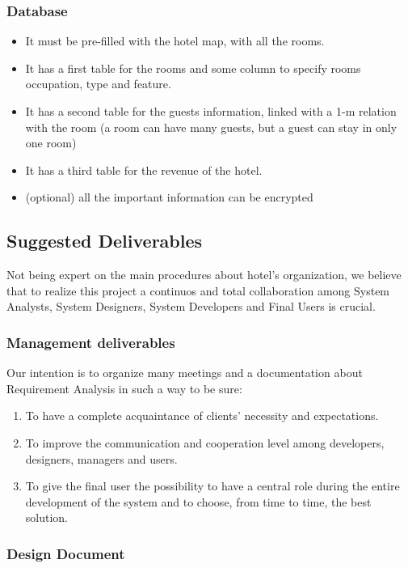 \subsubsection{Database}
    \begin{itemize}
	\item It must be pre-filled with the hotel map, with all the rooms.
	\item It has a first table for the rooms and some column to specify rooms occupation, type and feature.
	\item It has a second table for the guests information, linked with a 1-m relation with the room (a room can have many guests, but a guest can stay in only one room)
	\item It has a third table for the revenue of the hotel.
	\item (optional) all the important information can be encrypted
    \end{itemize}
    
\subsection{Suggested Deliverables}

Not being expert on the main procedures about hotel’s organization, we believe that to realize this project a continuos and total collaboration among System Analysts, System Designers, System Developers and Final Users is crucial.

\subsubsection{Management deliverables}

Our intention is to organize many meetings and a documentation about Requirement Analysis in such a way to be sure:
\begin{enumerate}
	\item To have a complete acquaintance of clients’ necessity and expectations.
	\item To improve the communication and cooperation level among developers, designers, managers and users.
	\item To give the final user the possibility to have a central role during the entire development of the system and to choose, from time to time, the best solution.
\end{enumerate}

\subsubsection{Design Document}

